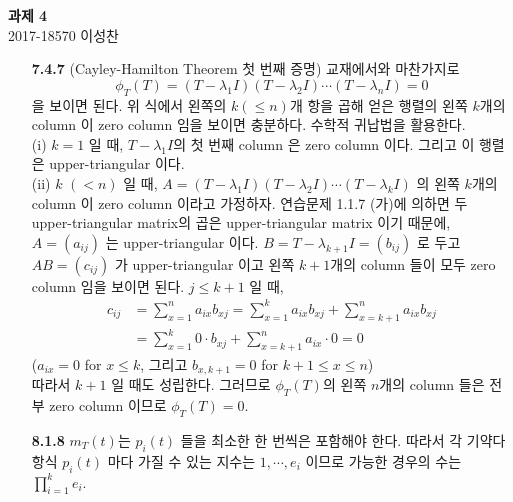 \documentclass[12pt]{report}
\newcommand\tab[1][5mm]{\hspace*{#1}}
\begin{document}
\begin{center}
\textbf{ 과제 4}\\
\large 2017-18570 이성찬
\end{center}

\begin{itemize}
\item[\textbf{7.4.7}] (Cayley-Hamilton Theorem 첫 번째 증명) 교재에서와 마찬가지로 $$\phi_T(T) = (T-\lambda_1I)(T-\lambda_2I)\cdots(T-\lambda_nI)=0$$ 을 보이면 된다. 위 식에서 왼쪽의 $k (\leq n)$개 항을 곱해 얻은 행렬의 왼쪽 $k$개의 column 이 zero column 임을 보이면 충분하다. 수학적 귀납법을 활용한다.\\
	\tab(i) $k=1$ 일 때, $T-\lambda_1I$의 첫 번째 column 은 zero column 이다. 그리고 이 행렬은 upper-triangular 이다. \\
	\tab(ii) $k$ $(< n)$ 일 때, $A = (T-\lambda_1I)(T-\lambda_2I)\cdots(T-\lambda_kI)$ 의 왼쪽 $k$개의 column 이 zero column 이라고 가정하자. 연습문제 1.1.7 (가)에 의하면 두 upper-triangular matrix의 곱은 upper-triangular matrix 이기 때문에, $A = (a_{ij})$ 는 upper-triangular 이다. $B = T-\lambda_{k+1}I = (b_{ij})$ 로 두고 $AB = (c_{ij})$ 가 upper-triangular 이고 왼쪽 $k+1$개의 column 들이 모두 zero column 임을 보이면 된다. $j \leq k+1$ 일 때,	
	$$\begin{aligned}
		c_{ij} &= \sum_{x=1}^n a_{ix}b_{xj} = \sum_{x=1}^k a_{ix}b_{xj} + \sum_{x=k+1}^n a_{ix}b_{xj} \\ &=\sum_{x=1}^k 0\cdot b_{xj} + \sum_{x=k+1}^n a_{ix} \cdot 0 = 0
	\end{aligned}$$ ($a_{ix} = 0$ for $x\leq k$, 그리고 $b_{x,k+1} = 0$ for $k+1\leq x \leq n$) \\따라서 $k+1$ 일 때도 성립한다. 그러므로 $\phi_T(T)$의 왼쪽 $n$개의 column 들은 전부 zero column 이므로 $\phi_T(T)=0$.
	
\item[\textbf{8.1.8}] $m_T(t)$는 $p_i(t)$ 들을 최소한 한 번씩은 포함해야 한다. 따라서 각 기약다항식 $p_i(t)$ 마다 가질 수 있는 지수는 $1, \cdots, e_i$ 이므로 가능한 경우의 수는 $\prod_{i=1}^ke_i$.


\end{itemize}
\end{document}
